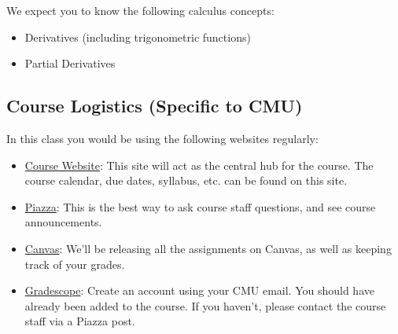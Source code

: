 \documentclass{16384_doc}
\begin{document}
We expect you to know the following calculus concepts:

\begin{itemize}
    \item Derivatives (including trigonometric functions)
    \item Partial Derivatives
\end{itemize}

\subsection{Course Logistics (Specific to CMU)}

In this class you would be using the following websites regularly:

\begin{itemize}
	\item \href{https://sites.google.com/site/robotkinematicscmu/}{Course Website}: This site will act as the central hub for the course. The course calendar, due dates, syllabus, etc. can be found on this site.
    \item \href{https://piazza.com/cmu/fall2020/16384a}{Piazza}: This is the best way to ask course staff questions, and see course announcements.
    \item \href{https://canvas.cmu.edu}{Canvas}: We'll be releasing all the assignments on Canvas, as well as keeping track of your grades.
    \item \href{http://gradescope.com}{Gradescope}: Create an account using your CMU email. You should have already been added to the course. If you haven't, please contact the course staff via a Piazza post.

\end{itemize}

\writtenSection
\end{document}
